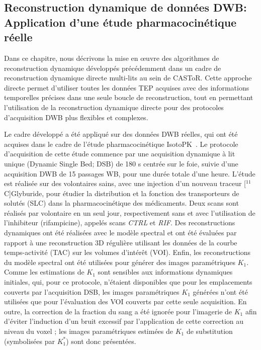 \subsection*{Reconstruction dynamique de données DWB: Application d'une étude pharmacocinétique réelle}
Dans ce chapitre, nous décrivons la mise en œuvre des algorithmes de reconstruction dynamique développés précédemment dans un cadre de reconstruction dynamique directe multi-lits au sein de CASToR. Cette approche directe permet d'utiliser toutes les données TEP acquises avec des informations temporelles précises dans une seule boucle de reconstruction, tout en permettant l'utilisation de la reconstruction dynamique directe pour des protocoles d'acquisition DWB plus flexibles et complexes.

Le cadre développé a été appliqué sur des données DWB réelles, qui ont été acquises dans le cadre de l'étude pharmacocinétique IsotoPK~\cite{Marie2019}. 
Le protocole d'acquisition de cette étude commence par une acquisition dynamique à lit unique (Dynamic Single Bed; DSB) de 180 s centrée sur le foie, suivie d'une acquisition DWB de 15 passages WB, pour une durée totale d'une heure. L'étude est réalisée sur des volontaires sains, avec une injection d'un nouveau traceur [$^{11}$C]Glyburide, pour étudier la distribution et la fonction des transporteurs de solutés (SLC) dans la pharmacocinétique des médicaments. Deux scans sont réalisés par volontaire en un seul jour, respectivement sans et avec l'utilisation de l'inhibiteur (rifampicine), appelés scans \textit{CTRL} et \textit{RIF}.
Des reconstructions dynamiques ont été réalisées avec le modèle spectral et ont été évaluées par rapport à une reconstruction 3D régulière utilisant les données de la courbe temps-activité (TAC) sur les volumes d'intérêt (VOI). Enfin, les reconstructions du modèle spectral ont été utilisées pour générer des images paramétriques $K_1$. Comme les estimations de $K_1$ sont sensibles aux informations dynamiques initiales, qui, pour ce protocole, n'étaient disponibles que pour les emplacements couverts par l'acquisition DSB, les images paramétriques $K_1$ générées n'ont été utilisées que pour l'évaluation des VOI couverts par cette seule acquisition. En outre, la correction de la fraction du sang a été ignorée pour l'imagerie de $K_1$ afin d'éviter l'induction d'un bruit excessif par l'application de cette correction au niveau du voxel ; les images paramétriques estimées de $K_1$ de substitution (symbolisées par $K_1^{*}$) sont donc présentées.

